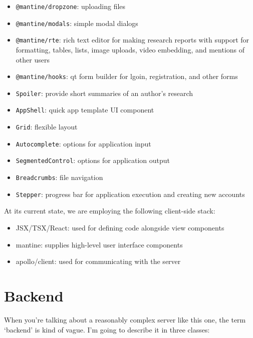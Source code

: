 \begin{itemize}
\tightlist
\item
  \texttt{@mantine/dropzone}: uploading files
\item
  \texttt{@mantine/modals}: simple modal dialogs
\item
  \texttt{@mantine/rte}: rich text editor for making research reports
  with support for formatting, tables, lists, image uploads, video
  embedding, and mentions of other users
\item
  \texttt{@mantine/hooks}: qt form builder for lgoin, registration, and
  other forms
\item
  \texttt{Spoiler}: provide short summaries of an author's research
\item
  \texttt{AppShell}: quick app template UI component
\item
  \texttt{Grid}: flexible layout
\item
  \texttt{Autocomplete}: options for application input
\item
  \texttt{SegmentedControl}: options for application output
\item
  \texttt{Breadcrumbs}: file navigation
\item
  \texttt{Stepper}: progress bar for application execution and creating
  new accounts
\end{itemize}

At its current state, we are employing the following client-side stack:

\begin{itemize}
\tightlist
\item
  JSX/TSX/React: used for defining code alongside view components
\item
  mantine: supplies high-level user interface components
\item
  apollo/client: used for communicating with the server
\end{itemize}

\hypertarget{backend}{%
\section{Backend}\label{backend}}

When you're talking about a reasonably complex server like this one, the
term `backend' is kind of vague. I'm going to describe it in three
classes:

